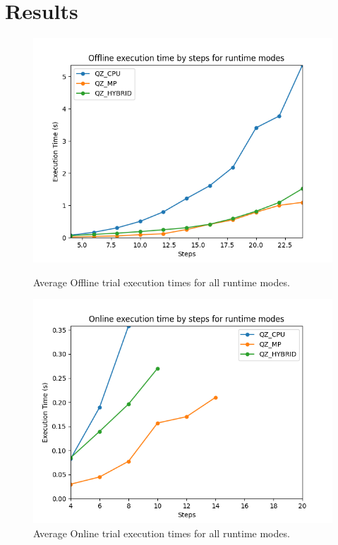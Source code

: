 \documentclass[runningheads]{llncs}
\begin{document}
\section{Results}

\begin{figure}[t]
\centering
\begin{minipage}{.5\textwidth}
    \centering
    \includegraphics[width=\linewidth]{profiler_out/offline_avg_unified.png}
    \caption{Average Offline trial execution times for all runtime modes.} \label{fig:offline_avg}
\end{minipage}%
\begin{minipage}{.5\textwidth}
    \includegraphics[width=\linewidth]{profiler_out/online_avg_unified.png}
    \caption{Average Online trial execution times for all runtime modes.} \label{fig:online_avg}
\end{minipage}
\end{figure}
\end{document}
